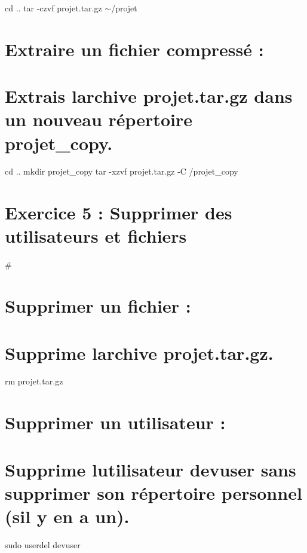 cd .. tar -\/czvf projet.\+tar.\+gz $\sim$/projet

\section*{Extraire un fichier compressé \+:}

\section*{Extrais l\textquotesingle{}archive projet.\+tar.\+gz dans un nouveau répertoire projet\+\_\+copy.}

cd .. mkdir projet\+\_\+copy tar -\/xzvf projet.\+tar.\+gz -\/C /projet\+\_\+copy

\section*{Exercice 5 \+: Supprimer des utilisateurs et fichiers}

\# \section*{Supprimer un fichier \+:}

\section*{Supprime l\textquotesingle{}archive projet.\+tar.\+gz.}

rm projet.\+tar.\+gz

\section*{Supprimer un utilisateur \+:}

\section*{Supprime l\textquotesingle{}utilisateur devuser sans supprimer son répertoire personnel (s\textquotesingle{}il y en a un).}

sudo userdel devuser 